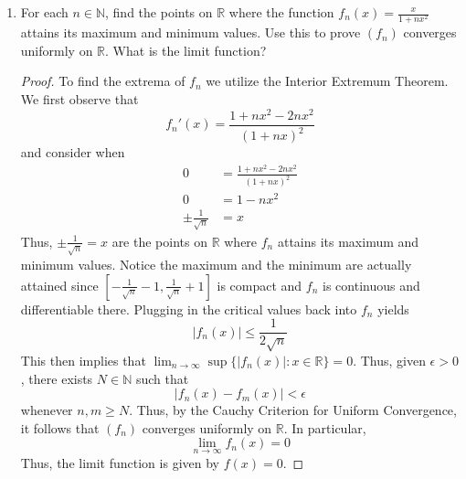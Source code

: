 \begin{enumerate}
\begin{proof}
\begin{enumerate}
        \item Observe that \( h(x) \) is not continuous at \( x =1 \) while \( h_n(x) \) is. Therefore, by negation of the consequent and Theorem 6.2.6, we get \( h_n \) does not converge to \( h \) uniformly on \( [0,\infty) \). 
        
        \item Notice when we take our set to simply be \( \{ 1 \} \) pointwise convergence of \( h_n \) implies uniform convergence of \( h_n \). 
    \end{enumerate}
    \end{proof}
    
    \item For each \( n \in \mathbb{N} \), find the points on \( \mathbb{R} \) where the function \( f_n(x) = \frac{x}{1+nx^2} \) attains its maximum and minimum values. Use this to prove \( (f_n) \) converges uniformly on \( \mathbb{R} \). What is the limit function?
    
    \begin{proof}
    To find the extrema of \( f_n \) we utilize the Interior Extremum Theorem. We first observe that
    \[
    f_n'(x) = \frac{1+nx^2-2nx^2}{(1+nx)^2}
    \]
    and consider when
    \begin{align*}
    0 &= \frac{1+nx^2-2nx^2}{(1+nx)^2} \\
    0 &= 1-nx^2 \\
    \pm \frac{1}{\sqrt{n}} &= x
    \end{align*}
    Thus, \( \pm \frac{1}{\sqrt{n}} = x \) are the points on \( \mathbb{R} \) where \( f_n \) attains its maximum and minimum values. Notice the maximum and the minimum are actually attained since \( \left[ -\frac{1}{\sqrt{n}}-1, \frac{1}{\sqrt{n}}+1 \right] \) is compact and \( f_n \) is continuous and differentiable there. Plugging in the critical values back into \( f_n \) yields
    \[
    \vert f_n(x) \vert \leq \frac{1}{2 \sqrt{n}}
    \]
    This then implies that \( \lim_{n \rightarrow \infty} \sup \{\vert f_n(x) \vert: x \in \mathbb{R}\} = 0 \). Thus, given \( \epsilon > 0 \), there exists \( N \in \mathbb{N} \) such that 
    \[
    \vert f_n(x) - f_m(x) \vert < \epsilon
    \]
    whenever \( n,m \geq N \). Thus, by the Cauchy Criterion for Uniform Convergence, it follows that \( (f_n) \) converges uniformly on \( \mathbb{R} \). In particular, 
    \[
    \lim_{n \rightarrow \infty} f_n(x) = 0
    \]
    Thus, the limit function is given by \( f(x) = 0 \). 
    \end{proof}
    

\end{enumerate}
